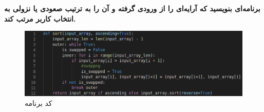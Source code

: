 \textbf{برنامه‌ای بنویسید که آرایه‌ای را از ورودی گرفته و آن را به ترتیب صعودی یا نزولی به انتخاب کاربر مرتب کند.}

\begin{figure}[!h]
	\begin{center}
		\includegraphics[width=\linewidth]{./9.png}
		\caption{کد برنامه}
	\end{center}
\end{figure}

